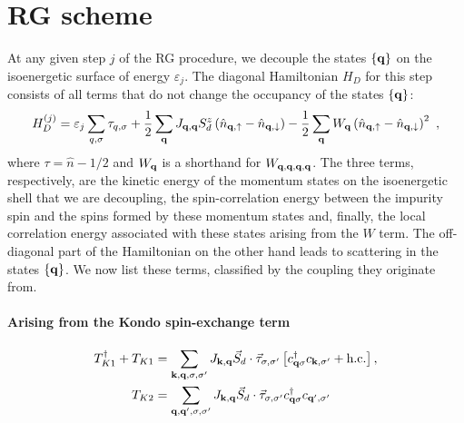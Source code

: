 \documentclass{revtex4-2}
\begin{document}
\section{RG scheme}
At any given step \(j\) of the RG procedure, we decouple the states \(\left\{ {\bf q} \right\} \) on the isoenergetic surface of energy \(\varepsilon_j\). The diagonal Hamiltonian \(H_D\) for this step consists of all terms that do not change the occupancy of the states \(\left\{{\bf q}\right\}\):
\begin{equation}\begin{aligned}
	H_D^{(j)} = \varepsilon_j\sum_{q,\sigma}\tau_{q,\sigma} + \frac{1}{2}\sum_{{\bf q}}J_{{\bf q}, {\bf q}}S_d^z\left(\hat n_{{\bf q}, \uparrow} - \hat n_{{\bf q}, \downarrow}\right) - \frac{1}{2}\sum_{{\bf q}}W_{\bf q}\left(\hat n_{{\bf q}, \uparrow} - \hat n_{{\bf q}, \downarrow}\right)^2~,
\end{aligned}\end{equation}
where \(\tau = \hat n - 1/2\) and \(W_{{\bf q}}\) is a shorthand for \(W_{{\bf q},{\bf q},{\bf q},{\bf q}}\). The three terms, respectively, are the kinetic energy of the momentum states on the isoenergetic shell that we are decoupling, the spin-correlation energy between the impurity spin and the spins formed by these momentum states and, finally, the local correlation energy associated with these states arising from the \(W\) term. The off-diagonal part of the Hamiltonian on the other hand leads to scattering in the states \(\left\{ {\bf q} \right\} \). We now list these terms, classified by the coupling they originate from.

\paragraph{Arising from the Kondo spin-exchange term}
\begin{equation}\begin{aligned}
	T_{K1}^\dagger + T_{K1} &= \sum_{{\bf k}, {\bf q}, \sigma,\sigma^\prime}J_{{\bf k}, {\bf q}} \vec{S}_d\cdot\vec{\tau}_{\sigma,\sigma^\prime}\left[c^\dagger_{{\bf q}\sigma}c_{{\bf k},\sigma^\prime} + \text{h.c.}\right],\\
	T_{K2} &= \sum_{{\bf q}, {\bf q}^\prime, \sigma,\sigma^\prime}J_{{\bf k}, {\bf q}} \vec{S}_d\cdot\vec{\tau}_{\sigma,\sigma^\prime}c^\dagger_{{\bf q}\sigma}c_{{\bf q}^\prime,\sigma^\prime}
\end{aligned}\end{equation}
\end{document}
